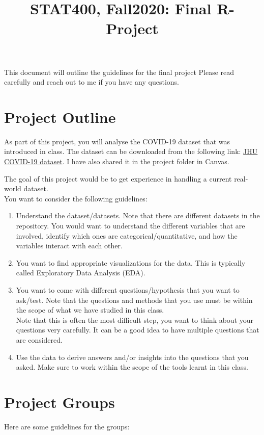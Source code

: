 \documentclass[11pt]{article}
\title{STAT400, Fall2020: \textbf{Final R-Project}}
\begin{document}
\maketitle
 
This document will outline the guidelines for the final project Please read carefully and reach out to me if you have any questions. 

\section{Project Outline}
As part of this project, you will analyse the COVID-19 dataset that was introduced in class. The dataset can be downloaded from the following link:
\href{https://github.com/CSSEGISandData/COVID-19}{JHU COVID-19 dataset}. I have also shared it in the project folder in Canvas. 

The goal of this project would be to get experience in handling a current real-world dataset. 
\\

You want to consider the following guidelines:
\begin{enumerate}
\item Understand the dataset/datasets. Note that there are different datasets in the repository. You would want to understand the different variables that are involved, identify which ones are categorical/quantitative, and how the variables interact with each other.
\item You want to find appropriate visualizations for the data. This is typically called Exploratory Data Analysis (EDA). 
\item You want to come with different questions/hypothesis that you want to ask/test. Note that the questions and methods that you use must be within the scope of what we have studied in this class.
\\ Note that this is often the most difficult step, you want to think about your questions very carefully. It can be a good idea to have multiple questions that are considered. 
\item Use the data to derive answers and/or insights into the questions that you asked. Make sure to work within the scope of the tools learnt in this class. 
\end{enumerate}


\section{Project Groups}
Here are some guidelines for the groups:
\end{document}

